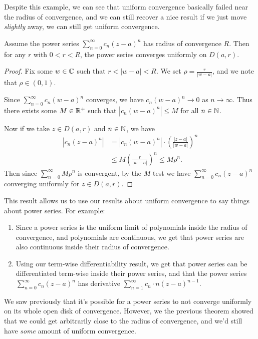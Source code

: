 \documentclass[a4paper]{scrartcl}
\begin{document}
Despite this example, we can see that uniform convergence basically failed near the radius of convergence, and we can still recover a nice result if we just move \emph{slightly} away, we can still get uniform convergence.

\begin{theorem}
    Assume the power series $\sum_{n = 0}^{\infty} c_n (z - a)^n$ has radius of convergence $R$. Then for any $r$ with $0 < r < R$, the power series converges uniformly on $D(a, r)$.
\end{theorem}
\begin{proof}
    Fix some $w \in \mathbb{C}$ such that $r < |w - a| < R$. We set $\rho = \frac{r}{|w - a|}$, and we note that $\rho \in (0, 1)$. 

    Since $\sum_{n = 0}^{\infty} c_n(w - a)^n$ converges, we have $c_n(w - a)^n \rightarrow 0$ as $n \rightarrow \infty$. Thus there exists some $M \in \mathbb{R}^+$ such that $|c_n(w - a)^n| \leq M$ for all $n \in \mathbb{N}$.

    Now if we take $z \in D(a, r)$ and $n \in \mathbb{N}$, we have
    \begin{align*}
        |c_n(z - a)^n| &= |c_n (w - a)^n| \cdot \left(\frac{|z - a|}{|w - a|}\right)^n \\
        &\leq M \left(\frac{r}{|w - a|}\right)^n \leq M \rho^n.
    \end{align*}
    Then since $\sum_{n = 0}^{\infty} M \rho^n$ is convergent, by the $M$-test we have $\sum_{n = 0}^{\infty} c_n(z - a)^n$ converging uniformly for $z \in D(a, r)$.
\end{proof}

This result allows us to use our results about uniform convergence to say things about power series. For example:

\begin{enumerate}
    \item Since a power series is the uniform limit of polynomials inside the radius of convergence, and polynomials are continuous, we get that power series are also continuous inside their radius of convergence.
    \item Using our term-wise differentiability result, we get that power series can be differentiated term-wise inside their power series, and that the power series $\sum_{n = 0}^{\infty} c_n(z - a)^n$ has derivative $\sum_{n = 1}^{\infty} c_n \cdot n (z - a)^{n - 1}$. 
\end{enumerate} 

We saw previously that it's possible for a power series to not converge uniformly on its whole open disk of convergence. However, we the previous theorem showed that we could get arbitrarily close to the radius of convergence, and we'd still have \emph{some} amount of uniform convergence.
\end{document}
